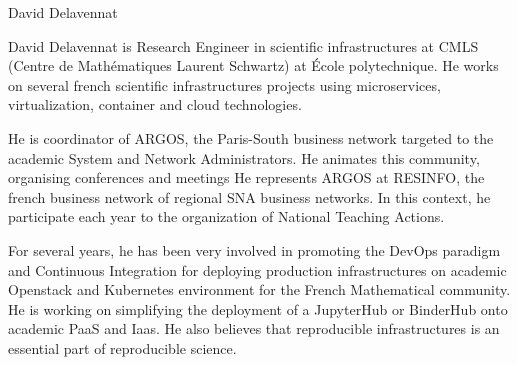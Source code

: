 \begin{participant}[type=R,PM=4,gender=male]{David Delavennat}

    David Delavennat is Research Engineer in scientific infrastructures at CMLS
    (Centre de Mathématiques Laurent Schwartz) at \'Ecole polytechnique. He
    works on several french scientific infrastructures projects using
    microservices, virtualization, container and cloud technologies.

    He is coordinator of ARGOS, the Paris-South business network targeted to the
    academic System and Network Administrators. He animates this community,
    organising conferences and meetings He represents ARGOS at RESINFO, the
    french business network of regional SNA business networks. In this context,
    he participate each year to the organization of National Teaching Actions.

    For several years, he has been very involved in promoting the DevOps
    paradigm and Continuous Integration for deploying production infrastructures
    on academic Openstack and Kubernetes environment for the French Mathematical
    community. He is working on simplifying the deployment of a JupyterHub or
    BinderHub onto academic PaaS and Iaas. He also believes that reproducible
    infrastructures is an essential part of reproducible science.

\end{participant}